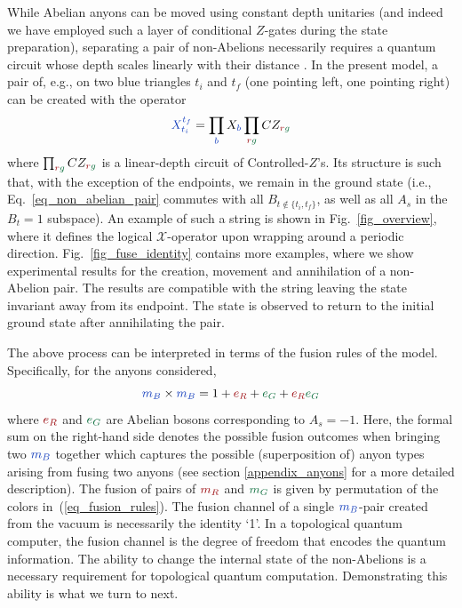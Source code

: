 \documentclass[nofootinbib,pra,twocolumn,showpacs,superscriptaddress,notitlepage,amsmath]{revtex4-2} %
\begin{document}
While Abelian anyons can be moved using constant depth unitaries (and indeed we have employed such a layer of conditional $Z$-gates during the state preparation), separating a pair of non-Abelions necessarily requires a quantum circuit whose depth scales linearly with their distance \cite{Shi19,Liu21,Bravyi22}. In the present model, a pair of, e.g.,  on two blue triangles $t_i$ and $t_f$ (one pointing left, one pointing right) can be created with the operator
\begin{equation}
    \blue{X_{t_i}^{t_f}} = \prod_{\blue{b}} X_{\blue{b}} \prod_{\red{r} \green{g}} CZ_{\red{r} \green{g}}
    \label{eq_non_abelian_pair}
\end{equation}
where $\prod_{\red{r} \green{g}} CZ_{\red{r} \green{g}}$ is a linear-depth circuit of Controlled-$Z$'s. Its structure is such that, with the exception of the endpoints, we remain in the ground state (i.e., Eq.~\eqref{eq_non_abelian_pair} commutes with all $B_{t \notin \{ t_i,t_f\}}$, as well as all $A_s$ in the $B_t=1$ subspace). An example of such a string is shown in Fig.~\ref{fig_overview}, where it defines the logical $\mathcal{X}$-operator upon wrapping around a periodic direction. Fig.~\ref{fig_fuse_identity} contains more examples, where we show experimental results for the creation, movement and annihilation of a non-Abelion pair. The results are compatible with the string leaving the state invariant away from its endpoint. The state is observed to return to the initial ground state after annihilating the pair.

The above process can be interpreted in terms of the fusion rules of the model. Specifically, for the anyons considered, 
\begin{equation}
    \blue{m_B} \times \blue{m_B} = 1 + \red{e_R} + \green{e_G} + \red{e_R} \green{e_G}
    \label{eq_fusion_rules}
\end{equation}
where $\red{e_R}$ and $\green{e_G}$ are Abelian bosons corresponding to $A_s=-1$. Here, the formal sum on the right-hand side denotes the possible fusion outcomes when bringing two $\blue{m_B}$ together which captures the possible (superposition of) anyon types arising from fusing two anyons (see section \ref{appendix_anyons} for a more detailed description). The fusion of pairs of $\red{m_R}$ and $\green{m_G}$ is given by permutation of the colors in~(\ref{eq_fusion_rules}). The fusion channel of a single $\blue{m_B}$-pair created from the vacuum is necessarily the identity `1'.
In a topological quantum computer, the fusion channel is the degree of freedom that encodes the quantum information. The ability to change the internal state of the non-Abelions is a necessary requirement for topological quantum computation. Demonstrating this ability is what we turn to next.
\end{document}
